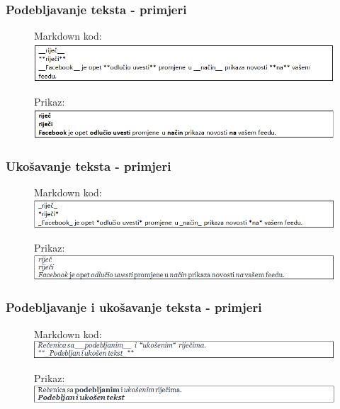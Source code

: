\documentclass{beamer}
\begin{document}
\begin{frame}
\frametitle{Podebljavanje teksta - primjeri}

\begin{figure}
{Markdown kod:}
\includegraphics[width = 1.0\linewidth]{Podebljavanje.png}
\end{figure}

\begin{figure}
{Prikaz:}
\includegraphics[width = 1.0\linewidth]{Prikaz1.png}
\end{figure}

\end{frame}

\newpage

\begin{frame}
\frametitle{Ukošavanje teksta - primjeri}

\begin{figure}
{Markdown kod:}
\includegraphics[width = 1.0\linewidth]{Ukosavanje.png}
\end{figure}

\begin{figure}
{Prikaz:}
\includegraphics[width = 1.0\linewidth]{Prikaz2.png}
\end{figure}

\end{frame}


\newpage

\begin{frame}
\frametitle{Podebljavanje i ukošavanje teksta - primjeri}

\begin{figure}
{Markdown kod:} 
\includegraphics[width = 1.0\linewidth]{Kombinacija.png}
\end{figure}

\begin{figure}
{Prikaz:}
\includegraphics[width = 1.0\linewidth]{Prikaz3.png}
\end{figure}

\end{frame}
\end{document}
